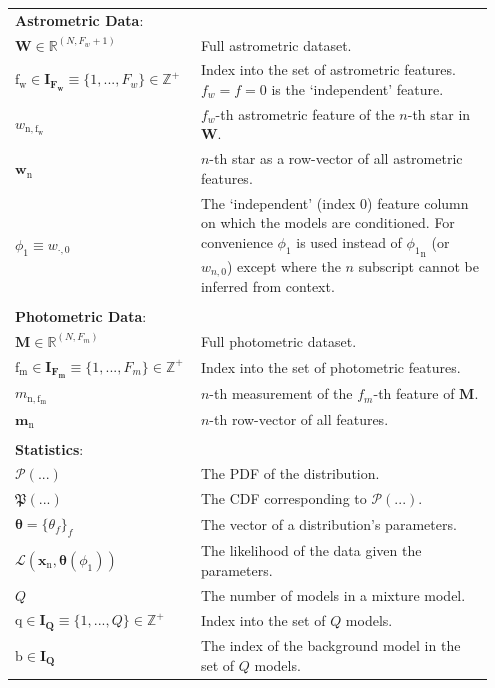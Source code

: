 \documentclass[twocolumn]{aastex631}
\newcommand{\mrm}[1]{\mathrm{#1}}
\newcommand{\mbs}[1]{\boldsymbol{#1}}
\newcommand{\mbf}[1]{\mathbf{#1}}
\newcommand{\mbb}[1]{\mathbb{#1}}
\newcommand{\mfk}[1]{\mathfrak{#1}}
\newcommand{\mcal}[1]{\mathcal{#1}}
\newcommand{\pdf}{\mcal{P}}
\newcommand{\cdf}{\mfk{P}}
\newcommand{\nth}[1]{{#1}_{\mrm{n}}}  %
\begin{document}
\begin{table}
\begin{tabular}{p{0.35\linewidth} p{0.6\linewidth}}
    \\
    \multicolumn{2}{l}{\textbf{Astrometric Data}:}  \vspace{5pt} \\
    $\mbf{W} \in \mathbb{R}^{(N, F_w + 1)}$ & Full astrometric dataset. \\
    $\mrm{f_w} \in \mbs{I_{F_w}} \equiv \{1, ..., F_w\} \in \mathbb{Z^+}$ & Index into the set of astrometric features. $f_w = f = 0$ is the `independent' feature.\\
    $w_{\mrm{n,f_w}}$ & $f_w$-th astrometric feature of the $n$-th star in $\mbf{W}.$\\
    $\nth{\mbs{w}}$ & $n$-th star as a row-vector of all astrometric features. \\
    $\phi_1 \equiv w_{\cdot,0}$ & The `independent' (index 0) feature column on which the models are conditioned. For convenience $\phi_1$ is used instead of $\nth{\phi_1}$ (or $w_{n,0}$) except where the $n$ subscript cannot be inferred from context.\\
    \\
    \multicolumn{2}{l}{\textbf{Photometric Data}:}  \vspace{5pt} \\
    $\mbf{M} \in \mathbb{R}^{(N, F_m)}$ & Full photometric dataset. \\
    $\mrm{f_m} \in \mbs{I_{F_m}} \equiv \{1, ..., F_m\} \in \mathbb{Z^+}$ & Index into the set of photometric features. \\
    $m_{\mrm{n,f_m}}$ & $n$-th measurement of the $f_m$-th feature of $\mbf{M}$. \\
    $\nth{\mbs{m}}$ & $n$-th row-vector of all features. \\
    \\
    \multicolumn{2}{l}{\textbf{Statistics}:} \\
    \midrule
    $\pdf(...)$ & The PDF of the distribution. \\
    $\cdf(...)$ & The CDF corresponding to $\pdf(...)$. \\
    $\mbs{\theta} = \{\theta_f\}_f$ & The vector of a distribution's parameters. \\
    $\mcal{L}(\nth{\mbf{x}}, \mbs{\theta}(\phi_1))$ & The likelihood of the data given the parameters. \\
    $Q$ & The number of models in a mixture model. \\
    $\mrm{q} \in \mbs{I_Q} \equiv \{1, ..., Q \} \in \mbb{Z^+}$ & Index into the set of $Q$ models. \\
    $\mrm{b} \in \mbs{I_Q}$ & The index of the background model in the set of $Q$ models.
    \\
    \end{tabular}
    \end{table}
\end{document}
